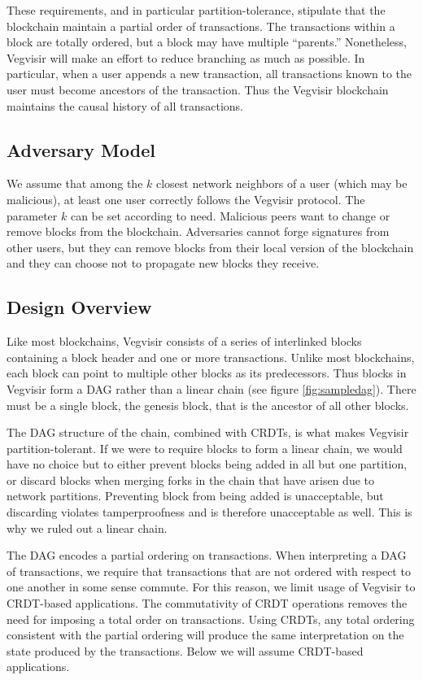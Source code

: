 \documentclass[conference, letterpaper]{IEEEtran}
\begin{document}
These requirements, and in particular partition-tolerance, stipulate that the blockchain maintain a partial order of transactions.  The transactions within a block are totally ordered, but a block may have multiple ``parents.''  Nonetheless, Vegvisir will make an effort to reduce branching as much as possible.  In particular, when a user appends a new transaction, all  transactions known to the user must become ancestors of the transaction.  Thus the Vegvisir blockchain maintains the causal history of all transactions.

\subsection{Adversary Model}

We assume that among the $k$ closest network neighbors of a user (which may be malicious), at least one user correctly follows the Vegvisir protocol. The parameter $k$ can be set according to need. Malicious peers want to change or remove blocks from the blockchain. Adversaries cannot forge signatures from other users, but they can remove blocks from their local version of the blockchain and they can choose not to propagate new blocks they receive.

\subsection{Design Overview}

Like most blockchains, Vegvisir consists of a series of interlinked blocks containing a block header and one or more transactions. Unlike most blockchains, each block can point to multiple other blocks as its predecessors. Thus blocks in Vegvisir form a DAG rather than a linear chain (see figure \ref{fig:sampledag}). There must be a single block, the genesis block, that is the ancestor of all other blocks.

The DAG structure of the chain, combined with CRDTs, is what makes Vegvisir partition-tolerant. If we were to require blocks to form a linear chain, we would have no choice but to either prevent blocks being added in all but one partition, or discard blocks when merging forks in the chain that have arisen due to network partitions. Preventing block from being added is unacceptable, but discarding violates tamperproofness and is therefore unacceptable as well.  This is why we ruled out a linear chain.

The DAG encodes a partial ordering on transactions. When interpreting a DAG of transactions, we require that transactions that are not ordered with respect to one another in some sense commute. For this reason, we limit usage of Vegvisir to CRDT-based applications. The commutativity of CRDT operations removes the need for imposing a total order on transactions.  Using CRDTs, any total ordering consistent with the partial ordering will produce the same interpretation on the state produced by the transactions.  Below we will assume CRDT-based applications.
\end{document}
